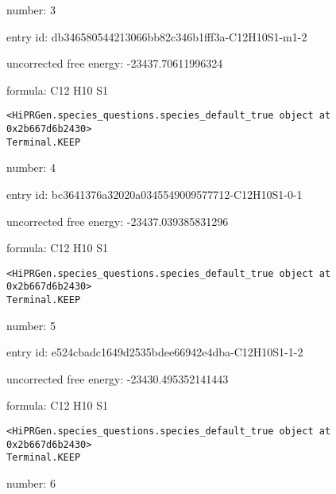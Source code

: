 \documentclass{article}
\begin{document}
number: 3



entry id: db346580544213066bb82c346b1fff3a-C12H10S1-m1-2



uncorrected free energy: -23437.70611996324



formula: C12 H10 S1


\vspace{1cm}
\begin{verbatim}
<HiPRGen.species_questions.species_default_true object at 0x2b667d6b2430>
Terminal.KEEP
\end{verbatim}


number: 4



entry id: bc3641376a32020a0345549009577712-C12H10S1-0-1



uncorrected free energy: -23437.039385831296



formula: C12 H10 S1


\vspace{1cm}
\begin{verbatim}
<HiPRGen.species_questions.species_default_true object at 0x2b667d6b2430>
Terminal.KEEP
\end{verbatim}


number: 5



entry id: e524cbadc1649d2535bdee66942e4dba-C12H10S1-1-2



uncorrected free energy: -23430.495352141443



formula: C12 H10 S1


\vspace{1cm}
\begin{verbatim}
<HiPRGen.species_questions.species_default_true object at 0x2b667d6b2430>
Terminal.KEEP
\end{verbatim}


number: 6
\end{document}

